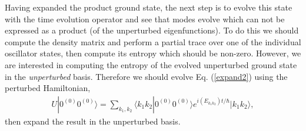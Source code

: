 \documentclass[aps,showpacs,onecolumn,floats,prd,superscriptaddress,nofootinbib]{revtex4-1}
\begin{document}
Having expanded the product ground state, the next step is to evolve this state with the time evolution operator and see that modes evolve which can not be expressed as a product (of the unperturbed eigenfunctions). To do this we should compute the density matrix and perform a partial trace over one of the individual oscillator states, then compute its entropy which should be non-zero. However, we are interested in computing the entropy of the evolved unperturbed ground state in the \textit{unperturbed} basis. Therefore we should evolve Eq. (\ref{expand2}) using the perturbed Hamiltonian, 
\begin{align}
U | 0^{(0)} 0^{(0)} \rangle = \sum_{k_1, k_2} \langle k_1 k_2 | 0^{(0)} 0^{(0)}\rangle e^{i(E_{k_1k_2})t/\hbar} | k_1 k_2 \rangle, \label{evolve1}
\end{align} 
then expand the result in the unperturbed basis.
\end{document}
